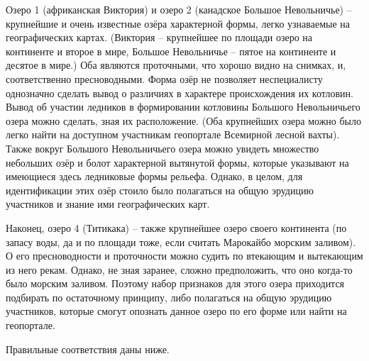 Озеро 1 (африканская Виктория) и озеро 2 (канадское Большое Невольничье) – крупнейшие и очень известные озёра характерной формы, легко узнаваемые на географических картах. (Виктория – крупнейшее по площади озеро на континенте и второе в мире, Большое Невольничье – пятое на континенте и десятое в мире.) Оба являются проточными, что хорошо видно на снимках, и, соответственно пресноводными. Форма озёр не позволяет неспециалисту однозначно сделать вывод о различиях в характере происхождения их котловин. Вывод об участии ледников в формировании котловины Большого Невольничьего озера можно сделать, зная их расположение. (Оба крупнейших озера можно было легко найти на доступном участникам геопортале Всемирной лесной вахты). Также вокруг Большого Невольничьего озера можно увидеть множество небольших озёр и болот характерной вытянутой формы, которые указывают на имеющиеся здесь ледниковые формы рельефа. Однако, в целом, для идентификации этих озёр стоило было полагаться на общую эрудицию участников и знание ими географических карт.

Наконец, озеро 4 (Титикака) – также крупнейшее озеро своего континента (по запасу воды, да и по площади тоже, если считать Марокайбо морским заливом). О его пресноводности и проточности можно судить по втекающим и вытекающим из него рекам. Однако, не зная заранее, сложно предположить, что оно когда-то было морским заливом. Поэтому набор признаков для этого озера приходится подбирать по остаточному принципу, либо полагаться на общую эрудицию участников, которые смогут опознать данное озеро по его форме или найти на геопортале.

Правильные соответствия даны ниже.